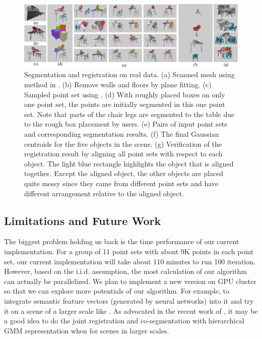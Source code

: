 \begin{figure}
	\centering
	\includegraphics[width=\linewidth]{images/realdata/realdata}
	\caption{\label{fig:realdata} Segmentation and registration on real data. (a) Scanned mesh using method in \cite{VXH}. (b) Remove walls and floors by plane fitting. (c) Sampled point set using \cite{PossionSampling}. (d) With roughly placed boxes on only one point set, the points are initially segmented in this one point set. Note that parts of the chair legs are segmented to the table due to the rough box placement by users. (e) Pairs of input point sets and corresponding segmentation results. (f) The final Gaussian centroids for the five objects in the scene. (g) Verification of the registration result by aligning all point sets with respect to each object. The light blue rectangle highlights the object that is aligned together. Except the aligned object, the other objects are placed quite messy since they came from different point sets and have different arrangement relative to the aligned object.   }
\end{figure} 


%
\subsection{Limitations and Future Work}
The biggest problem holding us back is the time performance of our current implementation. For a group of 11 point sets with about 9K points in each point set, our current implementation will take about 110 minutes to run 100 iteration. 
However, based on the i.i.d. assumption, the most calculation of our algorithm can actually be parallelized. 
We plan to implement a new version on GPU cluster so that we can explore more potentials of our algorithm. 
For example, to integrate semantic feature vectors (generated by neural networks) into it and try it on a scene of a larger scale like \cite{GOGMA}. 
As advocated in the recent work of \cite{AGM}, it may be a good idea to do the joint registration and co-segmentation with hierarchical GMM representation when for scenes in larger scales. 